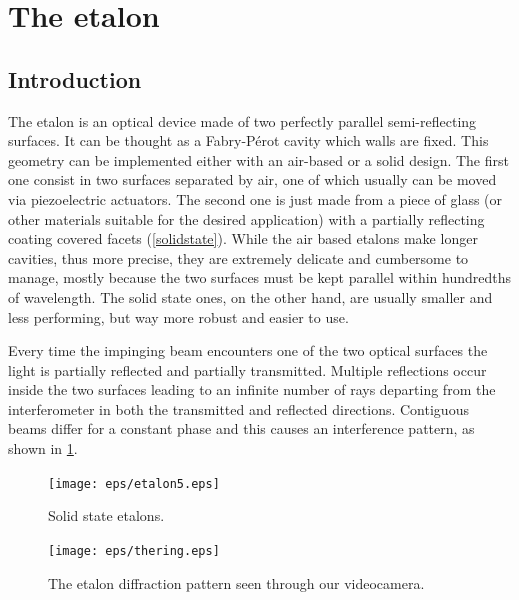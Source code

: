 \section{The etalon}
\subsection{Introduction}
The etalon is an optical device made of two perfectly parallel semi-reflecting surfaces. It can be thought as a Fabry-P\'erot cavity which walls are fixed. This geometry can be implemented either with an air-based or a solid design. The first one consist in two surfaces separated by air, one of which usually can be moved via piezoelectric actuators. The second one is just made from a piece of glass (or other materials suitable for the desired application) with a partially reflecting coating covered facets (\cref{solidstate}). While the air based etalons make longer cavities, thus more precise, they are extremely delicate and cumbersome to manage, mostly because the two surfaces must be kept parallel within hundredths of wavelength. The solid state ones, on the other hand, are usually smaller and less performing, but way more robust and easier to use.

Every time the impinging beam encounters one of the two optical surfaces the light is partially reflected and partially transmitted. Multiple reflections occur inside the two surfaces leading to an infinite number of rays departing from the interferometer in both the transmitted and reflected directions. Contiguous beams differ for a constant phase and this causes an interference pattern, as shown in \cref{etalonmonitor}.

\begin{figure}[!h]\centering
\begin{minipage}[t]{0.46\textwidth}\centering
\texttt{[image: eps/etalon5.eps]}
\caption{Solid state etalons.}
\label{solidstate}
\end{minipage}
\hfill
\begin{minipage}[t]{0.46\textwidth}\centering
\texttt{[image: eps/thering.eps]}
\caption{The etalon diffraction pattern seen through our videocamera.}
\label{etalonmonitor}
\end{minipage}
\end{figure}


